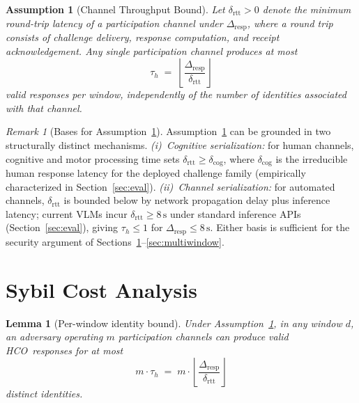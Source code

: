 \documentclass[11pt]{article}
\newcommand{\HCO}{HCO\xspace}
\newtheorem{lemma}{Lemma}
\newtheorem{assumption}{Assumption}
\theoremstyle{remark}
\newtheorem{remark}{Remark}
\theoremstyle{plain}
\begin{document}
	\begin{assumption}[Channel Throughput Bound]
		\label{asm:throughput}
		Let $\delta_{\mathrm{rtt}} > 0$ denote the minimum round-trip
		latency of a participation channel under $\Delta_{\mathrm{resp}}$,
		where a round trip consists of challenge delivery, response
		computation, and receipt acknowledgement. Any single participation
		channel produces at most
		\[
		\tau_h \;=\; \left\lfloor \frac{\Delta_{\mathrm{resp}}}{\delta_{\mathrm{rtt}}} \right\rfloor
		\]
		valid responses per window, independently of the number of
		identities associated with that channel.
	\end{assumption}
	
	\begin{remark}[Bases for Assumption~\ref{asm:throughput}]
		\label{rem:h4-bases}
		Assumption~\ref{asm:throughput} can be grounded in two
		structurally distinct mechanisms.
		\emph{(i)~Cognitive serialization:} for human channels,
		cognitive and motor processing time sets
		$\delta_{\mathrm{rtt}} \geq \delta_{\mathrm{cog}}$, where
		$\delta_{\mathrm{cog}}$ is the irreducible human response latency
		for the deployed challenge family (empirically characterized
		in Section~\ref{sec:eval}).
		\emph{(ii)~Channel serialization:} for automated channels,
		$\delta_{\mathrm{rtt}}$ is bounded below by network propagation
		delay plus inference latency; current VLMs incur
		$\delta_{\mathrm{rtt}} \geq 8\,\mathrm{s}$ under standard
		inference APIs (Section~\ref{sec:eval}), giving
		$\tau_h \leq 1$ for $\Delta_{\mathrm{resp}} \leq 8\,\mathrm{s}$.
		Either basis is sufficient for the security argument of
		Sections~\ref{sec:cost}--\ref{sec:multiwindow}.
	\end{remark}
	
	\section{Sybil Cost Analysis}
	\label{sec:cost}
	
	\begin{lemma}[Per-window identity bound]
		\label{lem:identity-bound}
		Under Assumption~\ref{asm:throughput}, in any window $d$, an adversary
		operating $m$ participation channels can produce valid \HCO\ responses
		for at most
		\[
		m \cdot \tau_h \;=\; m \cdot
		\left\lfloor\frac{\Delta_{\mathrm{resp}}}{\delta_{\mathrm{rtt}}}\right\rfloor
		\]
		distinct identities.
	\end{lemma}
	
\end{document}
